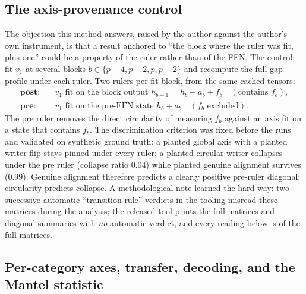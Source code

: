 \documentclass[11pt]{article}
\begin{document}
\subsection{The axis-provenance control}
\label{sec:provenance}

The objection this method answers, raised by the author against the author's
own instrument, is that a result anchored to ``the block where the ruler was
fit, plus one'' could be a property of the ruler rather than of the FFN. The
control: fit $v_1$ at several blocks $b \in \{p{-}4, p{-}2, p, p{+}2\}$ and
recompute the full gap profile under each ruler. Two rulers per fit block,
from the same cached tensors:
\begin{align*}
\textbf{post}:&\quad v_1 \text{ fit on the block output }
h_{b+1} = h_b + a_b + f_b \quad (\text{contains } f_b),\\
\textbf{pre}:&\quad v_1 \text{ fit on the pre-FFN state }
h_b + a_b \quad (f_b \text{ excluded}).
\end{align*}
The pre ruler removes the direct circularity of measuring $f_b$ against an
axis fit on a state that contains $f_b$. The discrimination criterion was
fixed before the runs and validated on synthetic ground truth: a planted
global axis with a planted writer flip stays pinned under every ruler; a
planted circular writer collapses under the pre ruler (collapse ratio
$0.04$) while planted genuine alignment survives ($0.99$). Genuine alignment
therefore predicts a clearly positive pre-ruler diagonal; circularity
predicts collapse. A methodological note learned the hard way: two
successive automatic ``transition-rule'' verdicts in the tooling misread
these matrices during the analysis; the released tool prints the full
matrices and diagonal summaries with \emph{no} automatic verdict, and every
reading below is of the full matrices.

\subsection{Per-category axes, transfer, decoding, and the Mantel statistic}
\label{sec:catmethods}
\end{document}

